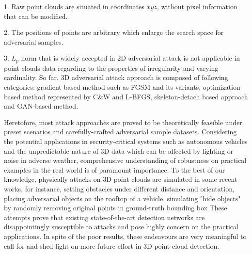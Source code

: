 1. Raw point clouds are situated in coordinates \(xyz\), without pixel information that can be modified. 

2. The positions of points are arbitrary which enlarge the search space for adversarial samples. 

3. \(L_{p}\) norm that is widely accepted in 2D adversarial attack is not applicable in point clouds data regarding to the properties of irregularity and varying cardinality\cite{xiang_generating_2019}. So far, 3D adversarial attack approach is composed of following categories: gradient-based method such as FGSM\cite{goodfellow_explaining_2015} and its variants\cite{gu_towards_2015,kurakin_adversarial_2017,dong_boosting_2018,madry_towards_2019,liu_extending_2019}, optimization-based method represented by C\&W\cite{carlini_towards_2017} and L-BFGS\cite{szegedy_intriguing_2014}, skeleton-detach based approach\cite{yang_adversarial_2019} and GAN-based method\cite{zhou_lg-gan_nodate,vedaldi_advpc_2020}. 

Heretofore, most attack approaches are proved to be theoretically feasible under preset scenarios and carefully-crafted adversarial sample datasets. Considering the potential applications in security-critical systems such as autonomous vehicles and the unpredictable nature of 3D data which can be affected by lighting or noise in adverse weather, comprehensive understanding of robustness on practical examples in the real world is of paramount importance. To the best of our knowledge, physically attacks on 3D point clouds are simulated in some recent works, for instance, setting obstacles under different distance and orientation\cite{cao_adversarial_2019}, placing adversarial objects on the rooftop of a vehicle\cite{tu_physically_2020}, simulating "hide objects" by randomly removing original points in ground-truth bounding box\cite{hau_object_2021} These attempts prove that existing state-of-the-art detection networks are disappointingly susceptible to attacks and pose highly concern on the practical applications. In spite of the poor results, these endeavours are very meaningful to call for and shed light on more future effort in 3D point cloud detection.

